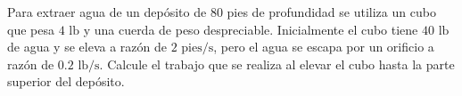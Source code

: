 \item Para extraer agua de un depósito de 80 pies de profundidad se utiliza un cubo que pesa $4 \text{ lb}$ y una cuerda de peso despreciable. Inicialmente el cubo tiene $40 \text{ lb}$ de agua y se eleva a razón de $2 \text{ pies/s}$, pero el agua se escapa por un orificio a razón de $0.2 \text{ lb/s}$. Calcule el trabajo que se realiza al elevar el cubo hasta la parte superior del depósito.
